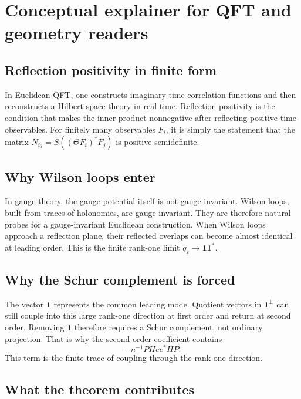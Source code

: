 \documentclass[11pt]{article}
\newcommand{\one}{\mathbf 1}
\newcommand{\eps}{\varepsilon}
\begin{document}
\appendix

\section{Conceptual explainer for QFT and geometry readers}
\label{app:conceptual-explainer}

\subsection{Reflection positivity in finite form}

In Euclidean QFT, one constructs imaginary-time correlation functions and then reconstructs a Hilbert-space theory in real time.  Reflection positivity is the condition that makes the inner product nonnegative after reflecting positive-time observables.  For finitely many observables \(F_i\), it is simply the statement that the matrix \(N_{ij}=S((\Theta F_i)^*F_j)\) is positive semidefinite.

\subsection{Why Wilson loops enter}

In gauge theory, the gauge potential itself is not gauge invariant.  Wilson loops, built from traces of holonomies, are gauge invariant.  They are therefore natural probes for a gauge-invariant Euclidean construction.  When Wilson loops approach a reflection plane, their reflected overlaps can become almost identical at leading order.  This is the finite rank-one limit \(q_\eps\to\one\one^*\).

\subsection{Why the Schur complement is forced}

The vector \(\one\) represents the common leading mode.  Quotient vectors in \(\one^\perp\) can still couple into this large rank-one direction at first order and return at second order.  Removing \(\one\) therefore requires a Schur complement, not ordinary projection.  That is why the second-order coefficient contains
\[
  -n^{-1}PHee^*HP.
\]
This term is the finite trace of coupling through the rank-one direction.

\subsection{What the theorem contributes}
\end{document}
